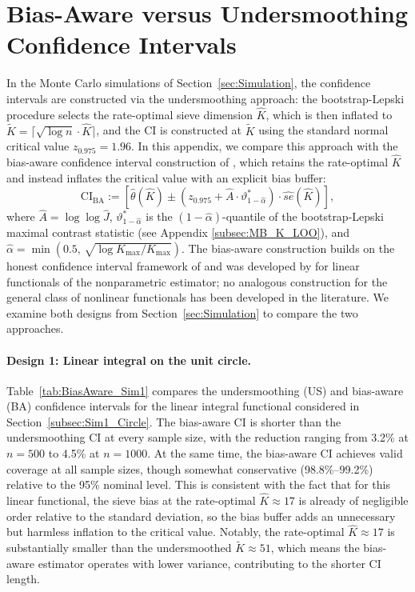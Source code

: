 \documentclass[12pt,american]{article}
\theoremstyle{definition}
\theoremstyle{plain}
\theoremstyle{definition}
\theoremstyle{plain}
\theoremstyle{plain}
\theoremstyle{plain}
\theoremstyle{plain}
\theoremstyle{plain}
\begin{document}
\section{Bias-Aware versus Undersmoothing Confidence Intervals}\label{sec:BiasAware}

In the Monte Carlo simulations of Section~\ref{sec:Simulation}, the confidence intervals are constructed via the undersmoothing approach: the bootstrap-Lepski procedure selects the rate-optimal sieve dimension $\hat{K}$, which is then inflated to $\tilde{K} = \lceil\sqrt{\log n}\cdot\hat{K}\rceil$, and the CI is constructed at $\tilde{K}$ using the standard normal critical value $z_{0.975}=1.96$. In this appendix, we compare this approach with the bias-aware confidence interval construction of \citet*{chen2025adaptive}, which retains the rate-optimal $\hat{K}$ and instead inflates the critical value with an explicit bias buffer:
\[
\text{CI}_{\text{BA}} := \left[\hat{\theta}(\hat{K}) \pm \left(z_{0.975} + \hat{A}\cdot \vartheta^*_{1-\hat{\alpha}}\right) \cdot \widehat{se}(\hat{K})\right],
\]
where $\hat{A} = \log\log \hat{J}$, $\vartheta^*_{1-\hat{\alpha}}$ is the $(1-\hat{\alpha})$-quantile of the bootstrap-Lepski maximal contrast statistic (see Appendix \ref{subsec:MB_K_LOO}), and $\hat{\alpha} = \min(0.5,\, \sqrt{\log K_{\max}/K_{\max}})$. The bias-aware construction builds on the honest confidence interval framework of \citet*{armstrong2018optimal,armstrong2020simple} and was developed by \citet*{chen2025adaptive} for linear functionals of the nonparametric estimator; no analogous construction for the general class of nonlinear functionals has been developed in the literature. We examine both designs from Section~\ref{sec:Simulation} to compare the two approaches.

\paragraph{Design 1: Linear integral on the unit circle.}
Table~\ref{tab:BiasAware_Sim1} compares the undersmoothing (US) and bias-aware (BA) confidence intervals for the linear integral functional considered in Section~\ref{subsec:Sim1_Circle}. The bias-aware CI is shorter than the undersmoothing CI at every sample size, with the reduction ranging from 3.2\% at $n=500$ to 4.5\% at $n=1000$. At the same time, the bias-aware CI achieves valid coverage at all sample sizes, though somewhat conservative (98.8\%--99.2\%) relative to the 95\% nominal level. This is consistent with the fact that for this linear functional, the sieve bias at the rate-optimal $\hat{K}\approx 17$ is already of negligible order relative to the standard deviation, so the bias buffer adds an unnecessary but harmless inflation to the critical value. Notably, the rate-optimal $\hat{K}\approx 17$ is substantially smaller than the undersmoothed $\tilde{K}\approx 51$, which means the bias-aware estimator operates with lower variance, contributing to the shorter CI length.
\end{document}
